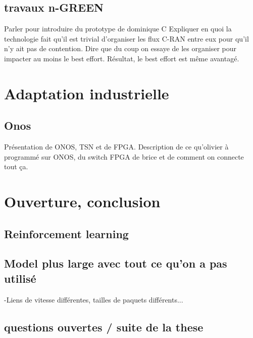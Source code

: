 \documentclass[a4paper,10pt]{article}
\begin{document}
\subsection{travaux n-GREEN}
Parler pour introduire du prototype de dominique C
Expliquer en quoi la technologie fait qu'il est trivial d'organiser les flux C-RAN entre eux pour qu'il n'y ait pas de contention. 
Dire que du coup on essaye de les organiser pour impacter au moins le best effort. Résultat, le best effort est même avantagé.
\section{Adaptation industrielle}
\subsection{Onos}
Présentation de ONOS, TSN et de FPGA. Description de ce qu'olivier à programmé sur ONOS, du switch FPGA de brice et de comment on connecte tout ça. 

\section{Ouverture, conclusion}

\subsection{Reinforcement learning}
\subsection{Model plus large avec tout ce qu'on a pas utilisé}
-Liens de vitesse différentes, tailles de paquets différents...
\subsection{questions ouvertes / suite de la these}



\end{document}
